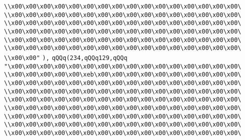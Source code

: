 \verb|\\x00\x00\x00\x00\x00\x00\x00\x00\x00\x00\x00\x00\x00\x00\x00\x00\|\newline
\verb|\\x00\x00\x00\x00\x00\x00\x00\x00\x00\x00\x00\x00\x00\x00\x00\x00\|\newline
\verb|\\x00\x00\x00\x00\x00\x00\x00\x00\x00\x00\x00\x00\x00\x00\x00\x00\|\newline
\verb|\\x00\x00\x00\x00\x00\x00\x00\x00\x00\x00\x00\x00\x00\x00\x00\x00\|\newline
\verb|\\x00\x00\x00\x00\x00\x00\x00\x00\x00\x00\x00\x00\x00\x00\x00\x00\|\newline
\verb|\\x00\x00\x00\x00\x00\x00\x00\x00\x00\x00\x00\x00\x00\x00\x00\x00\|\newline
\verb|\\x00\x00"|\newline
\verb|),|\newline
\verb|qQQq(234,qQQq129,qQQq|\newline
\verb|"\x00\x00\x00\x00\x00\x00\x00\x00\x00\x00\x00\x00\x00\x00\x00\x00\|\newline
\verb|\\x00\x00\x00\x00\x00\xeb\x00\x00\x00\x00\x00\x00\x00\x00\x00\x00\|\newline
\verb|\\x00\x00\x00\x00\x00\x00\x00\x00\x00\x00\x00\x00\x00\x00\x00\x00\|\newline
\verb|\\x00\x00\x00\x00\x00\x00\x00\x00\x00\x00\x00\x00\x00\x00\x00\x00\|\newline
\verb|\\x00\x00\x00\x00\x00\x00\x00\x00\x00\x00\x00\x00\x00\x00\x00\x00\|\newline
\verb|\\x00\x00\x00\x00\x00\x00\x00\x00\x00\x00\x00\x00\x00\x00\x00\x00\|\newline
\verb|\\x00\x00\x00\x00\x00\x00\x00\x00\x00\x00\x00\x00\x00\x00\x00\x00\|\newline
\verb|\\x00\x00\x00\x00\x00\x00\x00\x00\x00\x00\x00\x00\x00\x00\x00\x00\|\newline
\verb|\\x00\x00\x00\x00\x00\x00\x00\x00\x00\x00\x00\x00\x00\x00\x00\x00\|\newline
